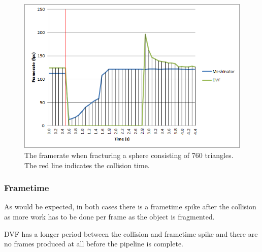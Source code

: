 \begin{figure}[h!]
\centerline{\includegraphics[scale=1.0]{../Logs/single_sphere_framerate.png}}
\caption{The framerate when fracturing a sphere consisting of 760 triangles. The red line indicates the collision time.}
\label{fig:4.14.1}
\end{figure}

\FloatBarrier

\clearpage
\subsubsection{Frametime}

As would be expected, in both cases there is a frametime spike after the collision as more work has to be done per frame as the object is fragmented.

DVF has a longer period between the collision and frametime spike and there are no frames produced at all before the pipeline is complete.

\FloatBarrier

